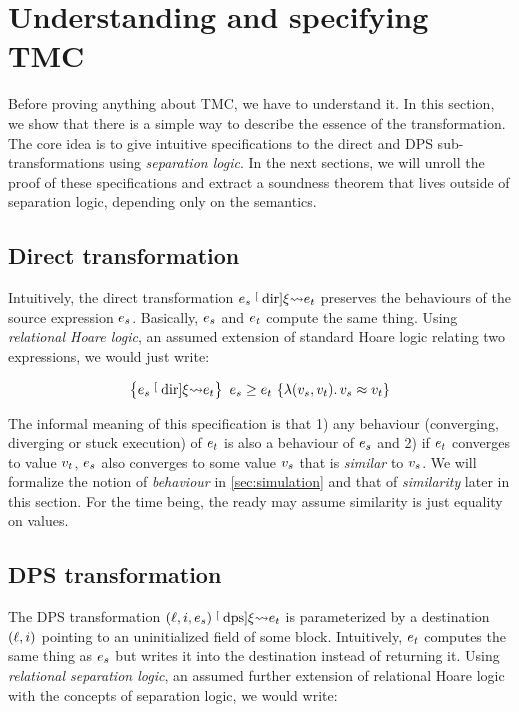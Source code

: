 \section{Understanding and specifying TMC}
\label{sec:specification}

Before proving anything about TMC, we have to understand it.
In this section, we show that there is a simple way to describe the essence of the transformation.
The core idea is to give intuitive specifications to the direct and DPS sub-transformations using \emph{separation logic}.
In the next sections, we will unroll the proof of these specifications and extract a soundness theorem that lives outside of separation logic, depending only on the \DataLang semantics.

\subsection{Direct transformation}

Intuitively, the direct transformation $\datalangExpr_s \tmcDir{\datalangRenaming} \datalangExpr_t$ preserves the behaviours of the source expression $\datalangExpr_s$.
Basically, $\datalangExpr_s$ and $\datalangExpr_t$ compute the same thing.
Using \emph{relational Hoare logic}, an assumed extension of standard Hoare logic relating two expressions, we would just write:

\[
    \iRsimvHoare{
        \datalangExpr_s \tmcDir{\datalangRenaming} \datalangExpr_t
    }{
        \lambdaAbs (\datalangVal_s, \datalangVal_t) \ldotp
        \datalangVal_s \iSimilar \datalangVal_t
    }{
        \datalangExpr_s
    }{
        \datalangExpr_t
    }
\]

The informal meaning of this specification is that 1) any behaviour (converging, diverging or stuck execution) of $\datalangExpr_t$ is also a behaviour of $\datalangExpr_s$ and 2) if $\datalangExpr_t$ converges to value $\datalangVal_t$, $\datalangExpr_s$ also converges to some value $\datalangVal_s$ that is \emph{similar} to $\datalangVal_s$.
We will formalize the notion of \emph{behaviour} in \cref{sec:simulation} and that of \emph{similarity} later in this section.
For the time being, the ready may assume similarity is just equality on values.

\subsection{DPS transformation}

The DPS transformation $(\datalangLoc, \datalangIdx, \datalangExpr_s) \tmcDps{\datalangRenaming} \datalangExpr_t$ is parameterized by a destination $(\datalangLoc, \datalangIdx)$ pointing to an uninitialized field of some block.
Intuitively, $\datalangExpr_t$ computes the same thing as $\datalangExpr_s$ but writes it into the destination instead of returning it.
Using \emph{relational separation logic}, an assumed further extension of relational Hoare logic with the concepts of separation logic, we would write:

